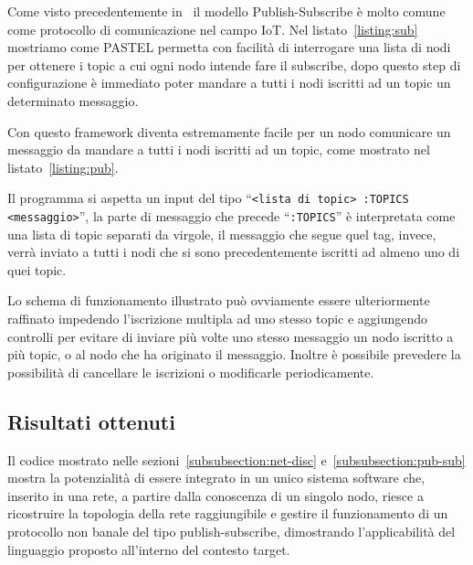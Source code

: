 \documentclass[]{article}
\begin{document}
Come visto precedentemente in~\cite{tandale2017empirical} il modello Publish-Subscribe è molto comune come protocollo di comunicazione nel campo IoT. Nel listato~\ref{listing:sub} mostriamo come PASTEL permetta con facilità di interrogare una lista di nodi per ottenere i topic a cui ogni nodo intende fare il subscribe, dopo questo step di configurazione è immediato poter mandare a tutti i nodi iscritti ad un topic un determinato messaggio.





Con questo framework diventa estremamente facile per un nodo comunicare un messaggio da mandare a tutti i nodi iscritti ad un topic, come mostrato nel listato~\ref{listing:pub}.

Il programma si aspetta un input del tipo ``\texttt{<lista di topic> :TOPICS <messaggio>}'', la parte di messaggio che precede ``\texttt{:TOPICS}'' è interpretata come una lista di topic separati da virgole, il messaggio che segue quel tag, invece, verrà inviato a tutti i nodi che si sono precedentemente iscritti ad almeno uno di quei topic.



Lo schema di funzionamento illustrato può ovviamente essere ulteriormente raffinato impedendo l'iscrizione multipla ad uno stesso topic e aggiungendo controlli per evitare di inviare più volte uno stesso messaggio un nodo iscritto a più topic, o al nodo che ha originato il messaggio. Inoltre è possibile prevedere la possibilità di cancellare le iscrizioni o modificarle periodicamente.

\subsection{Risultati ottenuti}\label{subsection:risultati}

Il codice mostrato nelle sezioni~\ref{subsubsection:net-disc} e~\ref{subsubsection:pub-sub} mostra la potenzialità di essere integrato in un unico sistema software che, inserito in una rete, a partire dalla conoscenza di un singolo nodo, riesce a ricostruire la topologia della rete raggiungibile e gestire il funzionamento di un protocollo non banale del tipo publish-subscribe, dimostrando l'applicabilità del linguaggio proposto all'interno del contesto target. 
\end{document}
